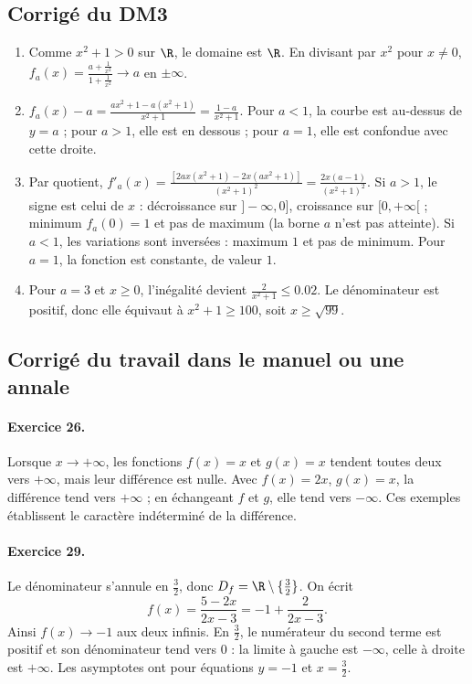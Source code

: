 \subsection{Corrigé du DM3}\begin{enumerate}
\item Comme $x^2+1>0$ sur $\R$, le domaine est $\R$. En divisant par $x^2$ pour $x\ne0$, $f_a(x)=\frac{a+\frac{1}{x^2}}{1+\frac{1}{x^2}}\to a$ en $\pm\infty$.
\item $f_a(x)-a=\frac{ax^2+1-a(x^2+1)}{x^2+1}=\frac{1-a}{x^2+1}$. Pour $a<1$, la courbe est au-dessus de $y=a$ ; pour $a>1$, elle est en dessous ; pour $a=1$, elle est confondue avec cette droite.
\item Par quotient, $f'_a(x)=\frac{[2ax(x^2+1)-2x(ax^2+1)]}{(x^2+1)^2}=\frac{2x(a-1)}{(x^2+1)^2}$.
Si $a>1$, le signe est celui de $x$ : décroissance sur $]-\infty,0]$, croissance sur $[0,+\infty[$ ; minimum $f_a(0)=1$ et pas de maximum (la borne $a$ n'est pas atteinte). Si $a<1$, les variations sont inversées : maximum $1$ et pas de minimum. Pour $a=1$, la fonction est constante, de valeur $1$.
\item Pour $a=3$ et $x\ge0$, l'inégalité devient $\frac{2}{x^2+1}\le\num{0,02}$. Le dénominateur est positif, donc elle équivaut à $x^2+1\ge100$, soit $x\ge\sqrt{99}$.
\end{enumerate}

\subsection{Corrigé du travail dans le manuel ou une annale}\paragraph{Exercice 26.} Lorsque $x\to+\infty$, les fonctions $f(x)=x$ et $g(x)=x$ tendent toutes deux vers $+\infty$, mais leur différence est nulle. Avec $f(x)=2x$, $g(x)=x$, la différence tend vers $+\infty$ ; en échangeant $f$ et $g$, elle tend vers $-\infty$. Ces exemples établissent le caractère indéterminé de la différence.
\paragraph{Exercice 29.} Le dénominateur s'annule en $\frac32$, donc $D_f=\R\setminus\{\frac32\}$. On écrit
\[f(x)=\frac{5-2x}{2x-3}=-1+\frac2{2x-3}.\]
Ainsi $f(x)\to-1$ aux deux infinis. En $\frac32$, le numérateur du second terme est positif et son dénominateur tend vers $0$ : la limite à gauche est $-\infty$, celle à droite est $+\infty$. Les asymptotes ont pour équations $y=-1$ et $x=\frac32$.

\fi

